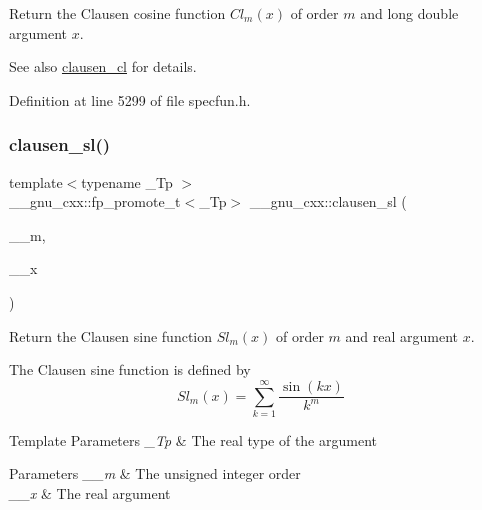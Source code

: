Return the Clausen cosine function $ Cl_m(x) $ of order $ m $ and {\ttfamily long double} argument $ x $.

\begin{DoxySeeAlso}{See also}
\hyperlink{group__gnu__math__spec__func_ga8786b86db309998f93f877cfb9bdfd57}{clausen\+\_\+cl} for details. 
\end{DoxySeeAlso}


Definition at line 5299 of file specfun.\+h.

\mbox{\label{group__gnu__math__spec__func_gacb757b00309213cd96bb2bc6b5dc3c24}} 
\subsubsection{\texorpdfstring{clausen\+\_\+sl()}{clausen\_sl()}}
{\footnotesize\ttfamily template$<$typename \+\_\+\+Tp $>$ \\
\+\_\+\+\_\+gnu\+\_\+cxx\+::fp\+\_\+promote\+\_\+t$<$\+\_\+\+Tp$>$ \+\_\+\+\_\+gnu\+\_\+cxx\+::clausen\+\_\+sl (\begin{DoxyParamCaption}\item[{unsigned int}]{\+\_\+\+\_\+m,  }\item[{\+\_\+\+Tp}]{\+\_\+\+\_\+x }\end{DoxyParamCaption})\hspace{0.3cm}{\ttfamily [inline]}}

Return the Clausen sine function $ Sl_m(x) $ of order $ m $ and real argument $ x $.

The Clausen sine function is defined by \[ Sl_m(x) = \sum_{k=1}^\infty\frac{\sin(kx)}{k^m} \]


\begin{DoxyTemplParams}{Template Parameters}
{\em \+\_\+\+Tp} & The real type of the argument \\
\hline
\end{DoxyTemplParams}

\begin{DoxyParams}{Parameters}
{\em \+\_\+\+\_\+m} & The unsigned integer order \\
\hline
{\em \+\_\+\+\_\+x} & The real argument \\
\hline
\end{DoxyParams}


